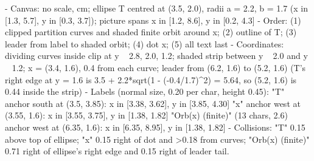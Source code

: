\begin{content}

\begin{hidden}
- Canvas: no scale, cm; ellipse T centred at (3.5, 2.0), radii a = 2.2, b = 1.7 (x in [1.3, 5.7], y in [0.3, 3.7]); picture spans x in [1.2, 8.6], y in [0.2, 4.3]
- Order: (1) clipped partition curves and shaded finite orbit around x; (2) outline of T; (3) leader from label to shaded orbit; (4) dot x; (5) all text last
- Coordinates: dividing curves inside clip at y ~ 2.8, 2.0, 1.2; shaded strip between y ~ 2.0 and y ~ 1.2; x = (3.4, 1.6), 0.4 from each curve; leader from (6.2, 1.6) to (5.2, 1.6) (T's right edge at y = 1.6 is 3.5 + 2.2*sqrt(1 - (-0.4/1.7)^2) = 5.64, so (5.2, 1.6) is 0.44 inside the strip)
- Labels (normal size, 0.20 per char, height 0.45):
  "T" anchor south at (3.5, 3.85): x in [3.38, 3.62], y in [3.85, 4.30]
  "x" anchor west at (3.55, 1.6): x in [3.55, 3.75], y in [1.38, 1.82]
  "Orb(x) (finite)" (13 chars, 2.6) anchor west at (6.35, 1.6): x in [6.35, 8.95], y in [1.38, 1.82]
- Collisions: "T" 0.15 above top of ellipse; "x" 0.15 right of dot and >0.18 from curves; "Orb(x) (finite)" 0.71 right of ellipse's right edge and 0.15 right of leader tail.
\end{hidden}
\begin{center}
\end{center}
\end{content}
